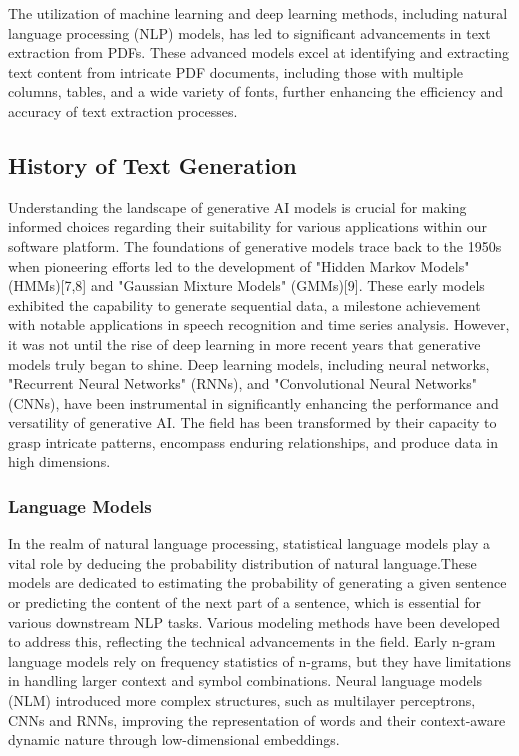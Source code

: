 \documentclass[conference]{IEEEtran}
\begin{document}
The utilization of machine learning and deep learning methods, including natural language processing (NLP) models, has led to significant advancements in text extraction from PDFs. These advanced models excel at identifying and extracting text content from intricate PDF documents, including those with multiple columns, tables, and a wide variety of fonts, further enhancing the efficiency and accuracy of text extraction processes.

\subsection{History of Text Generation}

Understanding the landscape of generative AI models is crucial for making informed choices regarding their suitability for various applications within our software platform. The foundations of generative models trace back to the 1950s when pioneering efforts led to the development of "Hidden Markov Models" (HMMs)[7,8] and "Gaussian Mixture Models" (GMMs)[9]. These early models exhibited the capability to generate sequential data, a milestone achievement with notable applications in speech recognition and time series analysis. However, it was not until the rise of deep learning in more recent years that generative models truly began to shine. Deep learning models, including neural networks, "Recurrent Neural Networks" (RNNs), and "Convolutional Neural Networks" (CNNs), have been instrumental in significantly enhancing the performance and versatility of generative AI. The field has been transformed by their capacity to grasp intricate patterns, encompass enduring relationships, and produce data in high dimensions.

\subsubsection{Language Models}

In the realm of natural language processing, statistical language models play a vital role by deducing the probability distribution of natural language.These models are dedicated to estimating the probability of generating a given sentence or predicting the content of the next part of a sentence, which is essential for various downstream NLP tasks. Various modeling methods have been developed to address this, reflecting the technical advancements in the field. Early n-gram language models rely on frequency statistics of n-grams, but they have limitations in handling larger context and symbol combinations. Neural language models (NLM) introduced more complex structures, such as multilayer perceptrons, CNNs and RNNs, improving the representation of words and their context-aware dynamic nature through low-dimensional embeddings.
\end{document}
